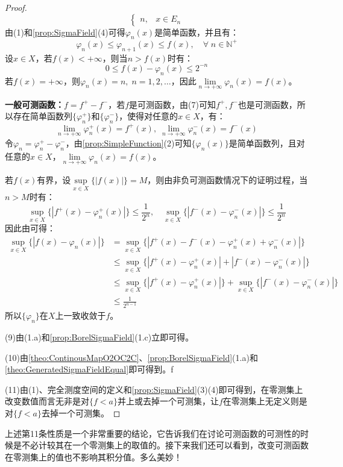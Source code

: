 \begin{proof}
\begin{equation*}
\begin{cases}
			n,&x\in E_n
		\end{cases}
	\end{equation*}
	由(1)和\cref{prop:SigmaField}(4)可得$\varphi_n(x)$是简单函数，并且有：
	\begin{equation*}
		\varphi_n(x)\leqslant\varphi_{n+1}(x)\leqslant f(x),\quad\forall\;n\in\mathbb{N}^+
	\end{equation*}
	设$x\in X$，若$f(x)<+\infty$，则当$n>f(x)$时有：
	\begin{equation*}
		0\leqslant f(x)-\varphi_n(x)\leqslant 2^{-n}
	\end{equation*}
	若$f(x)=+\infty$，则$\varphi_n(x)=n,\;n=1,2,\dots$，因此$\lim\limits_{n\to+\infty}\varphi_n(x)=f(x)$。\par
	\textbf{一般可测函数：}$f=f^+-f^-$，若$f$是可测函数，由(7)可知$f^+,f^-$也是可测函数，所以存在简单函数列$\{\varphi_n^+\}$和$\{\varphi_n^-\}$，使得对任意的$x\in X$，有：
	\begin{equation*}
		\lim\limits_{n\to+\infty}\varphi_n^+(x)=f^+(x),\;
		\lim\limits_{n\to+\infty}\varphi_n^-(x)=f^-(x)
	\end{equation*}
	令$\varphi_n=\varphi_n^+-\varphi_n^-$，由\cref{prop:SimpleFunction}(2)可知$\{\varphi_n(x)\}$是简单函数列，且对任意的$x\in X$，$\lim\limits_{n\to+\infty}\varphi_n(x)=f(x)$。\par
	若$f(x)$有界，设$\sup\limits_{x\in X}\{|f(x)|\}=M$，则由非负可测函数情况下的证明过程，当$n>M$时有：
	\begin{equation*}
		\sup_{x\in X}\{|f^+(x)-\varphi_n^+(x)|\}\leqslant\frac{1}{2^n},\quad
		\sup_{x\in X}\{|f^-(x)-\varphi_n^-(x)|\}\leqslant\frac{1}{2^n}
	\end{equation*}
	因此由可得：
	\begin{align*}
		\sup_{x\in X}\{|f(x)-\varphi_n(x)|\}
		&=\sup_{x\in X}\{|f^+(x)-f^-(x)-\varphi_n^+(x)+\varphi_n^-(x)|\} \\
		&\leqslant\sup_{x\in X}\{|f^+(x)-\varphi_n^+(x)|+|f^-(x)-\varphi_n^-(x)|\} \\
		&\leqslant\sup_{x\in X}\{|f^+(x)-\varphi_n^+(x)|\}+\sup_{x\in X}\{|f^-(x)-\varphi_n^-(x)|\} \\
		&\leqslant\frac{1}{2^{n-1}}
	\end{align*}
	所以$\{\varphi_n\}$在$X$上一致收敛于$f$。\par
	(9)由(1.a)和\cref{prop:BorelSigmaField}(1.c)立即可得。\par
	(10)由\cref{theo:ContinousMapO2OC2C}、\cref{prop:BorelSigmaField}(1.a)和\cref{theo:GeneratedSigmaFieldEqual}即可得到。f\par
	(11)由(1)、完全测度空间的定义和\cref{prop:SigmaField}(3)(4)即可得到，在零测集上改变数值而言无非是对$\{f<a\}$并上或去掉一个可测集，让$f$在零测集上无定义则是对$\{f<a\}$去掉一个可测集。
\end{proof}
\begin{note}
	上述第11条性质是一个非常重要的结论，它告诉我们在讨论可测函数的可测性的时候是不必计较其在一个零测集上的取值的。接下来我们还可以看到，改变可测函数在零测集上的值也不影响其积分值。多么美妙！
\end{note}


